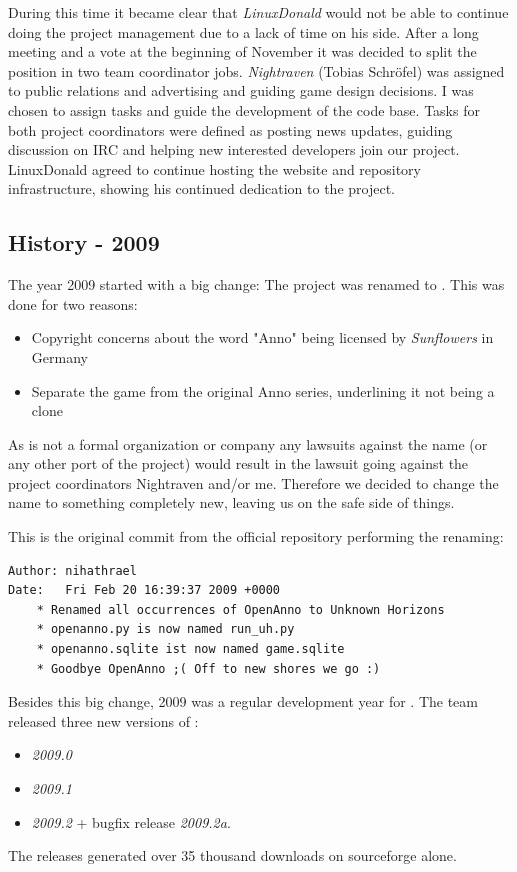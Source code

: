 During this time it became clear that \textit{LinuxDonald} would not be able to continue doing the project management
due to a lack of time on his side. After a long meeting and a vote at the beginning of November it was decided to split the
position in two team coordinator jobs. \textit{Nightraven} (Tobias Schröfel) was assigned to public relations and
advertising and guiding game design decisions. I was chosen to assign tasks and guide the development of the code base.
Tasks for both project coordinators were defined as posting news updates, guiding discussion on IRC and helping new
interested developers join our project. LinuxDonald agreed to continue hosting the website and repository
infrastructure, showing his continued dedication to the project.

\subsection{History - 2009}
The year 2009 started with a big change: The project was renamed to \UH{}. This was done for two reasons:
\begin{itemize}
    \item Copyright concerns about the word "Anno" being licensed by \textit{Sunflowers} in Germany
    \item Separate the game from the original Anno series, underlining it not being a clone
\end{itemize}

As \UH{} is not a formal organization or company any lawsuits against the name (or any other port of the project) would
result in the lawsuit going against the project coordinators Nightraven and/or me. Therefore we decided to change the name to
something completely new, leaving us on the safe side of things.

This is the original commit from the official repository performing the renaming:
\begin{lstlisting}[caption=Commit 1831 renaming OpenAnno to Unknown Horizons, label=renamecommit]
Author: nihathrael
Date:   Fri Feb 20 16:39:37 2009 +0000
    * Renamed all occurrences of OpenAnno to Unknown Horizons
    * openanno.py is now named run_uh.py
    * openanno.sqlite ist now named game.sqlite
    * Goodbye OpenAnno ;( Off to new shores we go :)
\end{lstlisting}

Besides this big change, 2009 was a regular development year for \UH{}. The team released three new versions of \UH{}:
\begin{itemize}
\item \textit{2009.0}
\item \textit{2009.1}
\item \textit{2009.2} + bugfix release \textit{2009.2a}. 
\end{itemize}
The releases generated over 35 thousand downloads on sourceforge alone.

